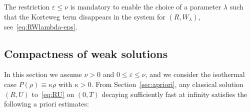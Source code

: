 \begin{rema}
The restriction $\varepsilon \le \nu$ is mandatory to enable the choice of a parameter $\lambda$ such that the Korteweg term disappears in the system for $(R,W_\lambda)$, see~\eqref{eq:RWlambda-eps}.
\end{rema}

\subsection{Compactness of weak solutions}

In this section we assume $\nu >0$ and $0 \le \varepsilon \le \nu$, and we consider the isothermal case $P(\rho)\equiv \kappa \rho$ with $\kappa >0$. From Section~\ref{sec:apriori}, any classical solution $(R,U)$ to~\eqref{eq:RU} on $(0,T)$ decaying sufficiently fast at infinity satisfies the following a priori estimates:

